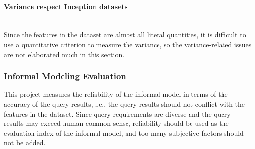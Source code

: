 \paragraph{Variance respect Inception datasets}\mbox{}\\
Since the features in the dataset are almost all literal quantities, it is difficult to use a quantitative criterion to measure the variance, so the variance-related issues are not elaborated much in this section.

\subsubsection{Informal Modeling Evaluation}
This project measures the reliability of the informal model in terms of the accuracy of the query results, i.e., the query results should not conflict with the features in the dataset. Since query requirements are diverse and the query results may exceed human common sense, reliability should be used as the evaluation index of the informal model, and too many subjective factors should not be added.